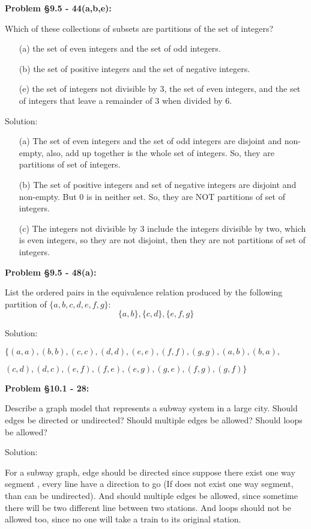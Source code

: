\documentclass{article}
\newenvironment{problem}[1]
{\begin{mdframed}[default]
\textbf{Problem #1:}
}
{\end{mdframed}
}
\begin{document}
\begin{problem}{\S 9.5 - 44(a,b,e)}
Which of these collections of subsets are partitions of the set of integers?
\begin{itemize}
\item[(a)] the set of even integers and the set of odd integers.
\item[(b)] the set of positive integers and the set of negative integers.
\item[(e)] the set of integers not divisible by 3, the set of even integers,
and the set of integers that leave a remainder of 3 when divided by 6.
\end{itemize}
Solution:
\begin{itemize}
    \item[(a)]The set of even integers and the set of odd integers are disjoint and non-empty, also, add up together is the whole set of integers. So, they are partitions of set of integers.
    \item[(b)]The set of positive integers and set of negative integers are disjoint and non-empty. But 0 is in neither set. So, they are NOT partitions of set of integers.
    \item[(c)]The integers not divisible by 3 include the integers divisible by two, which is even integers, so they are not disjoint, then they are not partitions of set of integers.
\end{itemize}

\end{problem}
\begin{problem}{\S 9.5 - 48(a)}
List the ordered pairs in the equivalence relation produced by the following
partition of $\{ a, b, c, d, e, f, g \}$:
\[ \{ a, b \}, \{ c, d \}, \{ e, f, g \} \]

Solution:

$\{(a,a),(b,b),(c,c),(d,d),(e,e),(f,f),(g,g),(a,b),(b,a),$

$(c,d),(d,c),(e,f),(f,e),(e,g),(g,e),(f,g),(g,f)\}$
\end{problem}
\begin{problem}{\S 10.1 - 28}
Describe a graph model that represents a subway system in a large city. Should
edges be directed or undirected? Should multiple edges be allowed? Should loops be
allowed?

Solution:

For a subway graph, edge should be directed since suppose there exist one way segment , every line have a direction to go (If does not exist one way segment, than can be undirected). And should multiple edges be allowed, since sometime there will be two different line between two stations. And loops should not be allowed too, since no one will take a train to its original station.
\end{problem}
\end{document}
